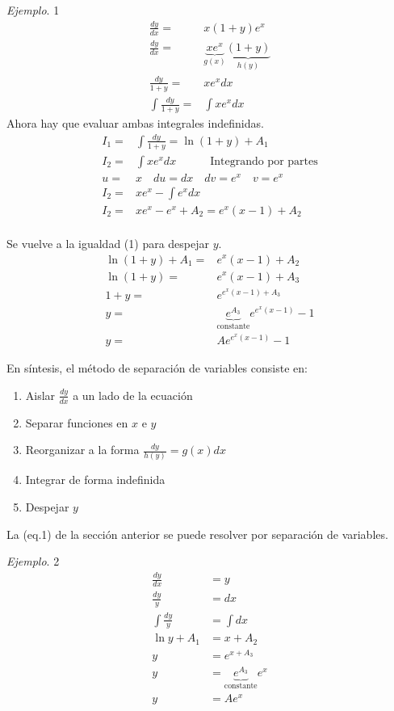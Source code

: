 \documentclass[spanish,12pt]{article}
\newcommand{\dydx}{\frac{dy}{dx}}
\begin{document}
\textit{Ejemplo}. 1
\begin{align*}
    \dydx=&x(1+y)e^x\\
    \dydx=&\underbrace{xe^x}_{g(x)}\underbrace{(1+y)}_{h(y)}\\
    \frac{dy}{1+y}=&xe^xdx\\
    \int\frac{dy}{1+y}=&\int xe^xdx \tag{(1)}
\end{align*}
Ahora hay que evaluar ambas integrales indefinidas.
\begin{align*}
    I_1=&\int\frac{dy}{1+y}=\ln{(1+y)}+A_1\\
    I_2=&\int xe^xdx \quad\quad\quad \text{Integrando por partes}\\
    u=&x\quad du=dx\quad dv=e^x \quad v=e^x\\
    I_2=&xe^x-\int e^xdx\\
    I_2=&xe^x-e^x+A_2=e^x(x-1)+A_2\\
\end{align*}

Se vuelve a la igualdad (1) para despejar $y$.
\begin{align*}
    \ln{(1+y)}+A_1=&e^x(x-1)+A_2\\
    \ln{(1+y)}=&e^x(x-1)+A_3\\
    1+y=&e^{e^x(x-1)+A_3}\\
    y=&\underbrace{e^{A_3}}_{\text{constante}}e^{e^x(x-1)}-1\\
    y=&Ae^{e^x(x-1)}-1
\end{align*}

En síntesis, el método de separación de variables consiste en:
\begin{enumerate}
    \item Aislar $\dydx$ a un lado de la ecuación
    \item Separar funciones en $x$ e $y$
    \item Reorganizar a la forma $\frac{dy}{h(y)}=g(x)dx$
    \item Integrar de forma indefinida
    \item Despejar $y$
\end{enumerate}

La (eq.1) de la sección anterior se puede resolver por separación de variables.

\textit{Ejemplo}. 2
\begin{align*}
    \dydx&=y\\
    \frac{dy}{y}&=dx\\
    \int\frac{dy}{y}&=\int dx\\
    \ln{y}+A_1&=x+A_2\\
    y&=e^{x+A_3}\\
    y&=\underbrace{e^{A_3}}_{\text{constante}}e^{x}\\
    y&=Ae^x
\end{align*}
\end{document}
